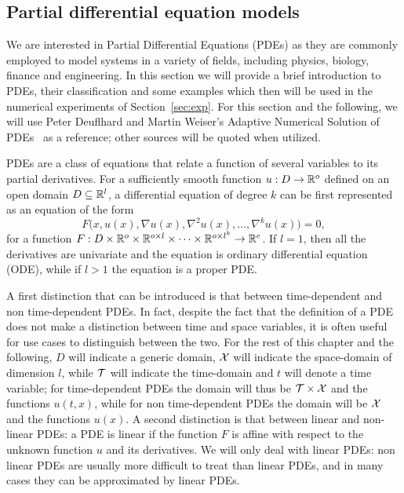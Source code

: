 \subsection{Partial differential equation models} \label{sec:PDE}

We are interested in Partial Differential Equations (PDEs) as they are commonly employed to model systems in a variety of fields, including physics, biology, finance and engineering.
In this section we will provide a brief introduction to PDEs, their classification and some examples which then will be used in the numerical experiments of Section~\ref{sec:exp}.
For this section and the following, we will use Peter Deuflhard and Martin Weiser's Adaptive Numerical Solution of PDEs~\cite{DeuflhardWeiser2012} as a reference; other sources will be quoted when utilized. \medskip

PDEs are a class of equations that relate a function of several variables to its partial derivatives.
For a sufficiently smooth function $u : D \rightarrow \mathbb{R}^o$ defined on an open domain $D \subseteq \mathbb{R}^l$, a differential equation of degree $k$ can be first represented as an equation of the form
\[
    F\big(x,u(x), \nabla u(x), \nabla^2 u(x), \dots, \nabla^k u(x)\big) = 0,
\]
for a function $F: D \times \mathbb{R}^o \times \mathbb{R}^{o \times l} \times \dots \times \mathbb{R}^{o \times l^k} \rightarrow \mathbb{R}^e$.
If $l =1$, then all the derivatives are univariate and the equation is ordinary differential equation (ODE), while if $l > 1$ the equation is a proper PDE. \medskip

A first distinction that can be introduced is that between time-dependent and non time-dependent PDEs.
In fact, despite the fact that the definition of a PDE does not make a distinction between time and space variables, it is often useful for use cases to distinguish between the two.
For the rest of this chapter and the following, $D$ will indicate a generic domain, $\mathcal X$ will indicate the space-domain of dimension $l$, while $\mathcal T$ will indicate the time-domain and $t$ will denote a time variable; for time-dependent PDEs the domain will thus be $\mathcal T \times \mathcal X$ and the functions $u(t,x)$, while for non time-dependent PDEs the domain will be $\mathcal X$ and the functions $u(x)$.
A second distinction is that between linear and non-linear PDEs: a PDE is linear if the function $F$ is affine with respect to the unknown function $u$ and its derivatives.
We will only deal with linear PDEs: non linear PDEs are usually more difficult to treat  than linear PDEs, and in many cases they can be approximated by linear PDEs.

